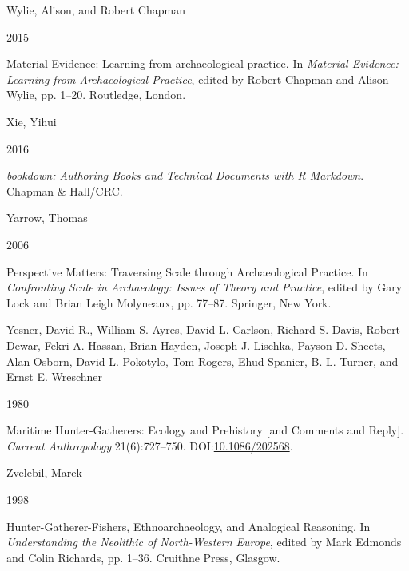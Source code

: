 \documentclass[
  12pt,
  a4paper,
  oneside]{book}
\newlength{\cslhangindent}
\newlength{\csllabelwidth}
\newlength{\cslentryspacingunit} %
\newenvironment{CSLReferences}[2] %
 {%
  \setlength{\parindent}{0pt}
  \ifodd #1
  \let\oldpar\par
  \def\par{\hangindent=\cslhangindent\oldpar}
  \fi
  \setlength{\parskip}{#2\cslentryspacingunit}
 }%
 {}
\newcommand{\CSLBlock}[1]{#1\hfill\break}
\newcommand{\CSLLeftMargin}[1]{\parbox[t]{\csllabelwidth}{#1}}
\newcommand{\CSLRightInline}[1]{\parbox[t]{\linewidth - \csllabelwidth}{#1}\break}
\begin{document}
\begin{CSLReferences}{0}{0}
\leavevmode{}%
\CSLBlock{Wylie, Alison, and Robert Chapman}
\CSLLeftMargin{ 2015}%
\CSLRightInline{{Material Evidence: Learning from archaeological practice}. In \emph{{Material Evidence: Learning from Archaeological Practice}}, edited by Robert Chapman and Alison Wylie, pp. 1--20. Routledge, London.}

\leavevmode{}%
\CSLBlock{Xie, Yihui}
\CSLLeftMargin{ 2016}%
\CSLRightInline{\emph{{bookdown: Authoring Books and Technical Documents with R Markdown}}. Chapman \& Hall/CRC.}

\leavevmode{}%
\CSLBlock{Yarrow, Thomas}
\CSLLeftMargin{ 2006}%
\CSLRightInline{{Perspective Matters: Traversing Scale through Archaeological Practice}. In \emph{{Confronting Scale in Archaeology: Issues of Theory and Practice}}, edited by Gary Lock and Brian Leigh Molyneaux, pp. 77--87. Springer, New York.}

\leavevmode{}%
\CSLBlock{Yesner, David R., William S. Ayres, David L. Carlson, Richard S. Davis, Robert Dewar, Fekri A. Hassan, Brian Hayden, Joseph J. Lischka, Payson D. Sheets, Alan Osborn, David L. Pokotylo, Tom Rogers, Ehud Spanier, B. L. Turner, and Ernst E. Wreschner}
\CSLLeftMargin{ 1980}%
\CSLRightInline{{Maritime Hunter-Gatherers: Ecology and Prehistory {[}and Comments and Reply{]}}. \emph{Current Anthropology} 21(6):727--750. DOI:\href{https://doi.org/10.1086/202568}{10.1086/202568}.}

\leavevmode{}%
\CSLBlock{Zvelebil, Marek}
\CSLLeftMargin{ 1998}%
\CSLRightInline{{Hunter-Gatherer-Fishers, Ethnoarchaeology, and Analogical Reasoning}. In \emph{{Understanding the Neolithic of North-Western Europe}}, edited by Mark Edmonds and Colin Richards, pp. 1--36. Cruithne Press, Glasgow.}

\end{CSLReferences}
\end{document}
